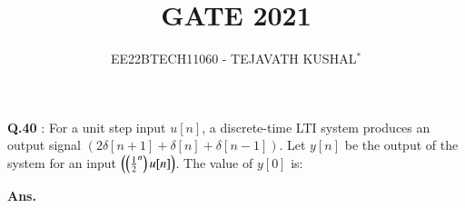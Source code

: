 \documentclass[journal,12pt,twocolumn]{IEEEtran}
\theoremstyle{remark}
\begin{document}

\vspace{3cm}

\title{GATE 2021}
\author{EE22BTECH11060 - TEJAVATH KUSHAL$^{*}$%
}
\maketitle
\newpage
\bigskip

\renewcommand{\thefigure}{\theenumi}
\renewcommand{\thetable}{\theenumi}


\maketitle
\noindent \textbf{Q.40} : 
For a unit step input $u[n]$, a discrete-time LTI system produces an output signal $(2\delta[n+1]+\delta[n]+\delta[n-1])$. Let $y[n]$ be the output of the system for an input $\left(\left(\frac{1}{2}^n\right)u[n]\right)$. The value of $y[0]$ is:
\begin{flushright}
\end{flushright}

\noindent \textbf{Ans.}
\fi

\begin{table}[h]
  
\end{table}
\end{document}
